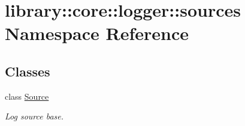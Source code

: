 \hypertarget{namespacelibrary_1_1core_1_1logger_1_1sources}{}\section{library\+:\+:core\+:\+:logger\+:\+:sources Namespace Reference}
\label{namespacelibrary_1_1core_1_1logger_1_1sources}
\subsection*{Classes}
\begin{DoxyCompactItemize}
\item 
class \hyperlink{classlibrary_1_1core_1_1logger_1_1sources_1_1_source}{Source}
\begin{DoxyCompactList}\small\item\em Log source base. \end{DoxyCompactList}\end{DoxyCompactItemize}

